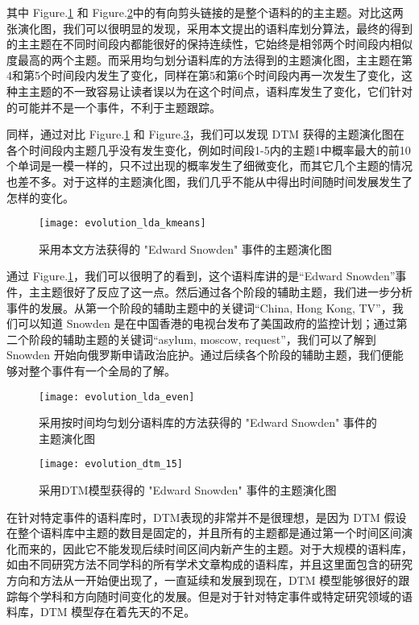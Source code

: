 其中 Figure.\ref{fig:evolution-our} 和 Figure.\ref{fig:evolution-even}中的有向剪头链接的是整个语料的的主主题。对比这两张演化图，我们可以很明显的发现，采用本文提出的语料库划分算法，最终的得到的主主题在不同时间段内都能很好的保持连续性，它始终是相邻两个时间段内相似度最高的两个主题。而采用均匀划分语料库的方法得到的主题演化图，主主题在第4和第5个时间段内发生了变化，同样在第5和第6个时间段内再一次发生了变化，这种主主题的不一致容易让读者误以为在这个时间点，语料库发生了变化，它们针对的可能并不是一个事件，不利于主题跟踪。

同样，通过对比 Figure.\ref{fig:evolution-our} 和 Figure.\ref{fig:evolution-dtm}，我们可以发现 DTM 获得的主题演化图在各个时间段内主题几乎没有发生变化，例如时间段1-5内的主题1中概率最大的前10个单词是一模一样的，只不过出现的概率发生了细微变化，而其它几个主题的情况也差不多。对于这样的主题演化图，我们几乎不能从中得出时间随时间发展发生了怎样的变化。

\begin{figure}[!htb]
	\centering
	\texttt{[image: evolution\_lda\_kmeans]}
	\caption{采用本文方法获得的 "Edward Snowden" 事件的主题演化图}
	\label{fig:evolution-our}
\end{figure}

通过 Figure.\ref{fig:evolution-our}，我们可以很明了的看到，这个语料库讲的是“Edward Snowden”事件，主主题很好了反应了这一点。然后通过各个阶段的辅助主题，我们进一步分析事件的发展。从第一个阶段的辅助主题中的关键词“China, Hong Kong, TV”，我们可以知道 Snowden 是在中国香港的电视台发布了美国政府的监控计划；通过第二个阶段的辅助主题的关键词“asylum, moscow, request”，我们可以了解到 Snowden 开始向俄罗斯申请政治庇护。通过后续各个阶段的辅助主题，我们便能够对整个事件有一个全局的了解。

\begin{figure}[!htb]
	\centering
	\texttt{[image: evolution\_lda\_even]}
	\caption{采用按时间均匀划分语料库的方法获得的 "Edward Snowden" 事件的主题演化图}
	\label{fig:evolution-even}
\end{figure}
\begin{figure}[!htb]
	\centering
	\texttt{[image: evolution\_dtm\_15]}
	\caption{采用DTM模型获得的 "Edward Snowden" 事件的主题演化图}
	\label{fig:evolution-dtm}
\end{figure}
在针对特定事件的语料库时，DTM表现的非常并不是很理想，是因为 DTM 假设在整个语料库中主题的数目是固定的，并且所有的主题都是通过第一个时间区间演化而来的，因此它不能发现后续时间区间内新产生的主题。对于大规模的语料库，如由不同研究方法不同学科的所有学术文章构成的语料库，并且这里面包含的研究方向和方法从一开始便出现了，一直延续和发展到现在，DTM 模型能够很好的跟踪每个学科和方向随时间变化的发展。但是对于针对特定事件或特定研究领域的语料库，DTM 模型存在着先天的不足。

